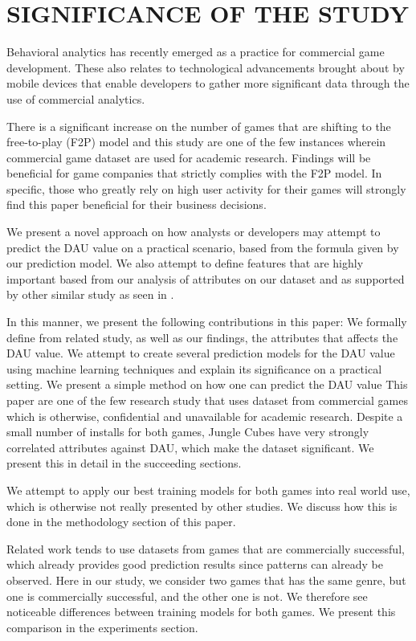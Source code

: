 %
%
%
\section{SIGNIFICANCE OF THE STUDY}
Behavioral analytics has recently emerged as a practice for commercial game development. These also relates to technological advancements brought about by mobile devices that enable developers to gather more significant data through the use of commercial analytics.

There is a significant increase on the number of games that are shifting to the free-to-play (F2P) model and this study are one of the few instances wherein commercial game dataset are used for academic research. Findings will be beneficial for game companies that strictly complies with the F2P model. In specific, those who greatly rely on high user activity for their games will strongly find this paper beneficial for their business decisions.

We present a novel approach on how analysts or developers may attempt to predict the DAU value on a practical scenario, based from the formula given by our prediction model. We also attempt to define features that are highly important based from our analysis of attributes on our dataset and as supported by other similar study as seen in \cite{ref:predicting_player_churn}.

In this manner, we present the following contributions in this paper:
We formally define from related study, as well as our findings,  the attributes that affects the DAU value.
We attempt to create several prediction models for the DAU value using machine learning techniques and explain its significance on a practical setting.
We present a simple method on how one can predict the DAU value
This paper are one of the few research study that uses dataset from commercial games which is otherwise, confidential and unavailable for academic research.
Despite a small number of installs for both games, Jungle Cubes have very strongly correlated attributes against DAU, which make the dataset significant. We present this in detail in the succeeding sections.

We attempt to apply our best training models for both games into real world use, which is otherwise not really presented by other studies. We discuss how this is done in the methodology section of this paper. 

Related work tends to use datasets from games that are commercially successful, which already provides good prediction results since patterns can already be observed. Here in our study, we consider two games that has the same genre, but one is commercially successful, and the other one is not. We therefore see noticeable differences between training models for both games. We present this comparison in the experiments section.

